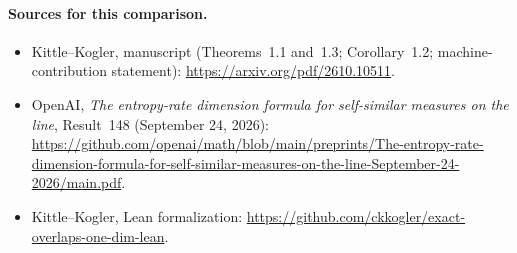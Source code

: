 \documentclass[11pt]{article}
\begin{document}
\paragraph{Sources for this comparison.}
\begin{itemize}[leftmargin=*,nosep]
 \item Kittle--Kogler, manuscript (Theorems~1.1 and~1.3;
       Corollary~1.2; machine-contribution statement):
       \url{https://arxiv.org/pdf/2610.10511}.
 \item OpenAI, \emph{The entropy-rate dimension formula for
       self-similar measures on the line}, Result~148 (September 24, 2026):
       \url{https://github.com/openai/math/blob/main/preprints/The-entropy-rate-dimension-formula-for-self-similar-measures-on-the-line-September-24-2026/main.pdf}.
 \item Kittle--Kogler, Lean formalization:
       \url{https://github.com/ckkogler/exact-overlaps-one-dim-lean}.
\end{itemize}
\end{document}
